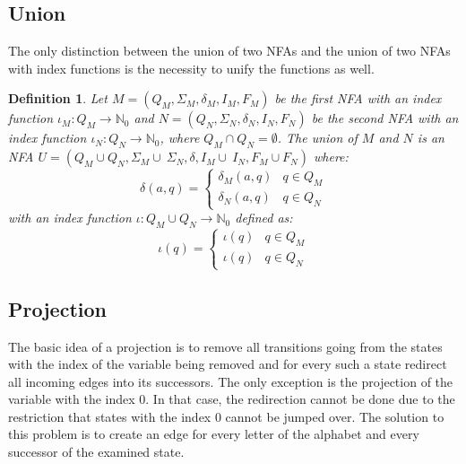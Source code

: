 \documentclass[pdflatex,sn-mathphys-num]{sn-jnl}%
\theoremstyle{thmstyleone}%
\theoremstyle{thmstyletwo}%
\theoremstyle{thmstylethree}%
\newtheorem{definition}{Definition}%
\begin{document}
    \subsection{Union}
        The only distinction between the union of two NFAs and the union of two NFAs with index functions is the necessity to unify the functions as well.

        \vspace*{0.5em}

        \begin{definition}
            Let $M = (Q_M, \Sigma_M, \delta_M, I_M, F_M)$ be the first NFA with an index function $\iota_M : Q_M \rightarrow \mathbb{N}_0$ and $N = (Q_N, \Sigma_N, \delta_N, I_N, F_N)$ be the second NFA with an index function $\iota_N : Q_N \rightarrow \mathbb{N}_0$, where $Q_M \cap Q_N = \emptyset$. The union of $M$ and $N$ is an NFA $U = (Q_M \cup Q_N, \Sigma_M \cup~\Sigma_N, \delta, I_M \cup~I_N, F_M \cup F_N)$ where:
            $$
            \delta(a, q) =
            \begin{cases}
                \delta_M(a, q) & q \in Q_M\\
                \delta_N(a, q) & q \in Q_N
            \end{cases}
            $$
            with an  index function $\iota : Q_M \cup Q_N \rightarrow \mathbb{N}_0$ defined as:
            $$
            \iota(q) =
            \begin{cases}
                \iota(q) & q \in Q_M\\
                \iota(q) & q \in Q_N
            \end{cases}
            $$
        \end{definition}

    \subsection{Projection}
        The basic idea of a projection is to remove all transitions going from the states with the index of the variable being removed and for every such a state redirect all incoming edges into its successors. The only exception is the projection of the variable with the index 0. In that case, the redirection cannot be done due to the restriction that states with the index 0 cannot be jumped over. The solution to this problem is to create an edge for every letter of the alphabet and every successor of the examined state.
\end{document}
